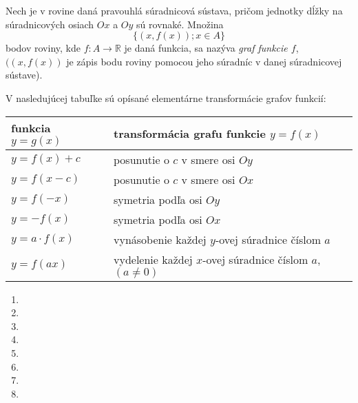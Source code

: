 Nech je v rovine daná pravouhlá súradnicová sústava, pričom jednotky dĺžky na
súradnicových osiach $Ox$ a $Oy$ sú rovnaké. Množina
\[
  \{(x,f(x)); x \in A\}
\]
bodov roviny, kde $f:A \rightarrow \mathbb{R}$ je daná funkcia, sa nazýva
\emph{graf funkcie $f$}, $((x,f(x))$ je zápis bodu roviny pomocou jeho súradníc
v danej súradnicovej sústave).

V nasledujúcej tabuľke sú opísané elementárne transformácie grafov funkcií:

\begin{center}
  \begin{tabular}{|p{}|p{}|}
    \hline
    {\bf funkcia $y=g(x)$} & {\bf transformácia grafu funkcie $y=f(x)$}  \\
    \hline
    $y = f(x) + c$     & posunutie o $c$ v smere osi $Oy$ \\
    $y = f(x - c)$     & posunutie o $c$ v smere osi $Ox$ \\
    $y = f(-x)$        & symetria podľa osi $Oy$ \\
    $y = -f(x)$        & symetria podľa osi $Ox$ \\
    $y = a \cdot f(x)$ & vynásobenie každej $y$-ovej súradnice číslom $a$ \\
    $y = f(ax)$        & vydelenie každej $x$-ovej súradnice číslom $a$, $(a \neq 0)$ \\
    \hline
  \end{tabular}
\end{center}

\begin{enumerate}[resume]
  \showanswers
  \item {}
  \hideanswers
  \item {}
  \item {}
  \showanswers
  \item {}
  \item {}
  \hideanswers
  \item {}
  \item {}
  \item {}
\end{enumerate}
